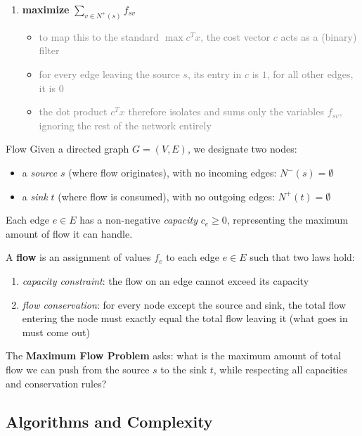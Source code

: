 \documentclass[a4paper, 11pt]{report}
\begin{document}
\begin{minipage}[t]{0.51\textwidth}
\begin{enumerate}
        \item \textbf{maximize} $\displaystyle \sum_{v \in N^+(s)} f_{sv}$
        \begin{itemize}
            \item \textcolor{gray}{\small to map this to the standard $\max c^T x$, the cost vector $c$ acts as a (binary) filter}
            \item \textcolor{gray}{\small for every edge leaving the source $s$, its entry in $c$ is $1$, for all other edges, it is $0$}
            \item \textcolor{gray}{\small the dot product $c^T x$ therefore isolates and sums only the variables $f_{sv}$, ignoring the rest of the network entirely}
        \end{itemize}
    \end{enumerate}
\end{minipage}

\begin{gframe}{Flow}
Given a directed graph $G = (V, E)$, we designate two nodes:
\begin{itemize}
    \item a \textit{source} $s$ (where flow originates), with no incoming edges: $N^-(s) = \emptyset$
    \item a \textit{sink} $t$ (where flow is consumed), with no outgoing edges: $N^+(t) = \emptyset$
\end{itemize}

Each edge $e \in E$ has a non-negative \textit{capacity} $c_e \ge 0$, representing the maximum amount of flow it can handle. 

A \textbf{flow} is an assignment of values $f_e$ to each edge $e \in E$ such that two laws hold:
\begin{enumerate}
    \item \textit{capacity constraint}: the flow on an edge cannot exceed its capacity
    \item \textit{flow conservation}: for every node except the source and sink, the total flow entering the node must exactly equal the total flow leaving it (what goes in must come out)
\end{enumerate}
\end{gframe}

The \textbf{Maximum Flow Problem} asks: what is the maximum amount of total flow we can push from the source $s$ to the sink $t$, while respecting all capacities and conservation rules?

\subsection{Algorithms and Complexity}
\end{document}
